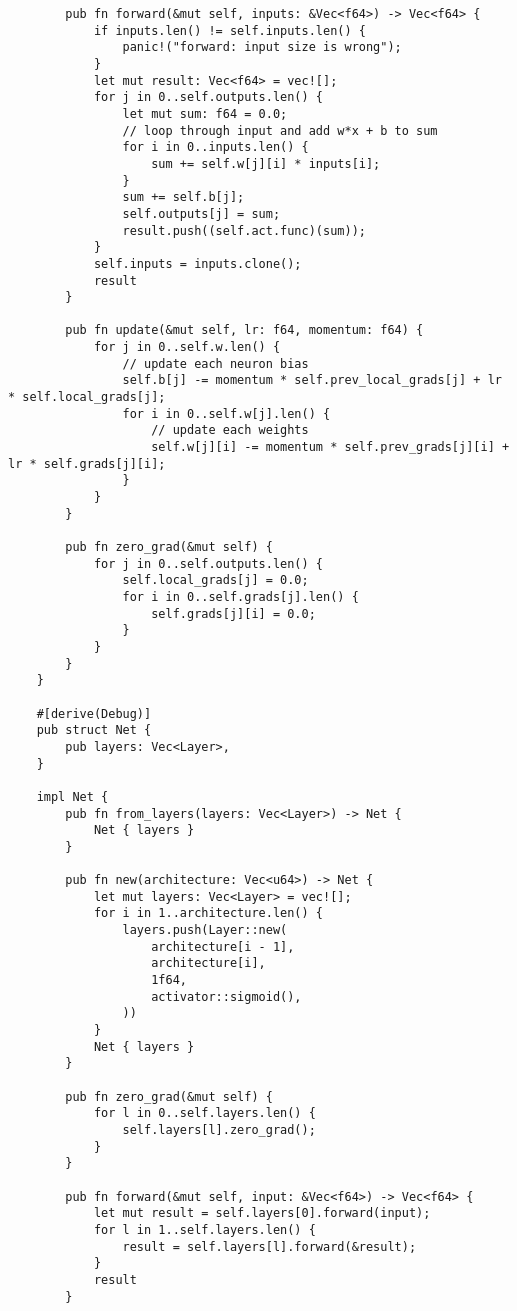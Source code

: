 \begin{verbatim}
        pub fn forward(&mut self, inputs: &Vec<f64>) -> Vec<f64> {
            if inputs.len() != self.inputs.len() {
                panic!("forward: input size is wrong");
            }
            let mut result: Vec<f64> = vec![];
            for j in 0..self.outputs.len() {
                let mut sum: f64 = 0.0;
                // loop through input and add w*x + b to sum
                for i in 0..inputs.len() {
                    sum += self.w[j][i] * inputs[i];
                }
                sum += self.b[j];
                self.outputs[j] = sum;
                result.push((self.act.func)(sum));
            }
            self.inputs = inputs.clone();
            result
        }
    
        pub fn update(&mut self, lr: f64, momentum: f64) {
            for j in 0..self.w.len() {
                // update each neuron bias
                self.b[j] -= momentum * self.prev_local_grads[j] + lr * self.local_grads[j]; 
                for i in 0..self.w[j].len() {
                    // update each weights
                    self.w[j][i] -= momentum * self.prev_grads[j][i] + lr * self.grads[j][i];
                }
            }
        }
    
        pub fn zero_grad(&mut self) {
            for j in 0..self.outputs.len() {
                self.local_grads[j] = 0.0;
                for i in 0..self.grads[j].len() {
                    self.grads[j][i] = 0.0;
                }
            }
        }
    }
    
    #[derive(Debug)]
    pub struct Net {
        pub layers: Vec<Layer>,
    }
    
    impl Net {
        pub fn from_layers(layers: Vec<Layer>) -> Net {
            Net { layers }
        }
    
        pub fn new(architecture: Vec<u64>) -> Net {
            let mut layers: Vec<Layer> = vec![];
            for i in 1..architecture.len() {
                layers.push(Layer::new(
                    architecture[i - 1],
                    architecture[i],
                    1f64,
                    activator::sigmoid(),
                ))
            }
            Net { layers }
        }
    
        pub fn zero_grad(&mut self) {
            for l in 0..self.layers.len() {
                self.layers[l].zero_grad();
            }
        }
    
        pub fn forward(&mut self, input: &Vec<f64>) -> Vec<f64> {
            let mut result = self.layers[0].forward(input);
            for l in 1..self.layers.len() {
                result = self.layers[l].forward(&result);
            }
            result
        }
    

\end{verbatim}
